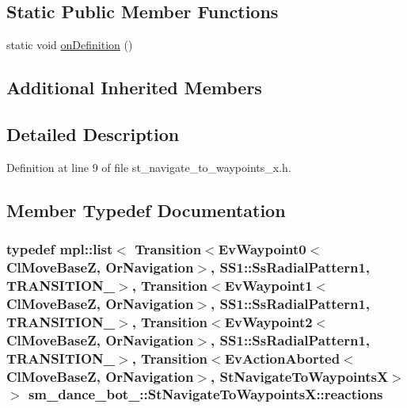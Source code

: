 \subsection*{Static Public Member Functions}
\begin{DoxyCompactItemize}
\item 
static void \hyperlink{structsm__dance__bot__2_1_1StNavigateToWaypointsX_a9d84dda897ac84bbf1c338dbc71ecf45}{on\+Definition} ()
\end{DoxyCompactItemize}
\subsection*{Additional Inherited Members}


\subsection{Detailed Description}


Definition at line 9 of file st\+\_\+navigate\+\_\+to\+\_\+waypoints\+\_\+x.\+h.



\subsection{Member Typedef Documentation}
\subsubsection[{\texorpdfstring{reactions}{reactions}}]{\setlength{\rightskip}{0pt plus 5cm}typedef mpl\+::list$<$ Transition$<${\bf Ev\+Waypoint0}$<${\bf Cl\+Move\+BaseZ}, {\bf Or\+Navigation}$>$, {\bf S\+S1\+::\+Ss\+Radial\+Pattern1}, {\bf T\+R\+A\+N\+S\+I\+T\+I\+O\+N\+\_}$>$, Transition$<${\bf Ev\+Waypoint1}$<${\bf Cl\+Move\+BaseZ}, {\bf Or\+Navigation}$>$, {\bf S\+S1\+::\+Ss\+Radial\+Pattern1}, {\bf T\+R\+A\+N\+S\+I\+T\+I\+O\+N\+\_}$>$, Transition$<${\bf Ev\+Waypoint2}$<${\bf Cl\+Move\+BaseZ}, {\bf Or\+Navigation}$>$, {\bf S\+S1\+::\+Ss\+Radial\+Pattern1}, {\bf T\+R\+A\+N\+S\+I\+T\+I\+O\+N\+\_}$>$, Transition$<$Ev\+Action\+Aborted$<${\bf Cl\+Move\+BaseZ}, {\bf Or\+Navigation}$>$, {\bf St\+Navigate\+To\+WaypointsX}$>$ $>$ {\bf sm\+\_\+dance\+\_\+bot\+\_\+::\+St\+Navigate\+To\+Waypoints\+X\+::reactions}}\hypertarget{structsm__dance__bot__2_1_1StNavigateToWaypointsX_a324e1d36077605571edf69adac5e7d26}{}\label{structsm__dance__bot__2_1_1StNavigateToWaypointsX_a324e1d36077605571edf69adac5e7d26}


